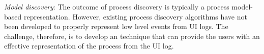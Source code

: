 \noindent \textit{Model discovery}: The outcome of process discovery is typically a process model-based representation. However, existing process discovery algorithms have not been developed to properly represent low level events from UI logs. The challenge, therefore, is to develop an technique that can provide the users with an effective representation of the process from the UI log. 

 
%

  
